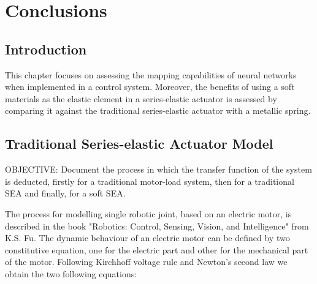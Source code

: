 \chapter{Conclusions}

\section{Introduction}

This chapter focuses on assessing the mapping capabilities of neural networks when implemented in a control system. Moreover, the benefits of using a soft materials as the elastic element in a series-elastic actuator is assessed by comparing it against the traditional series-elastic actuator with a metallic spring.

\section{Traditional Series-elastic Actuator Model}

OBJECTIVE: Document the process in which the transfer function of the system is deducted, firstly for a traditional motor-load system, then for a traditional SEA and finally, for a soft SEA.

The process for modelling single robotic joint, based on an electric motor, is described in the book "Robotics: Control, Sensing, Vision, and Intelligence" from K.S. Fu. The dynamic behaviour of an electric motor can be defined by two constitutive equation, one for the electric part and other for the mechanical part of the motor. Following Kirchhoff voltage rule and Newton's second law we obtain the two following equations:

